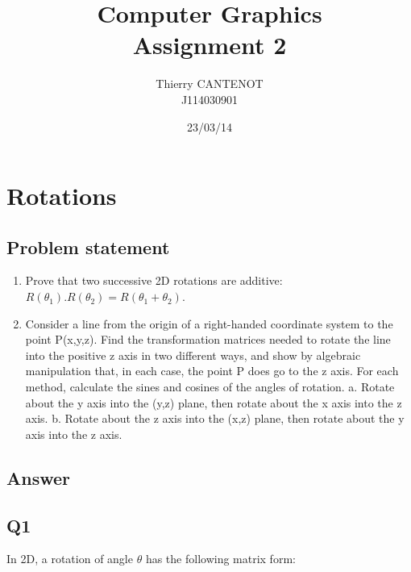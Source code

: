 \documentclass[a4paper,10pt]{article}
\title{\textbf{Computer Graphics} \\ Assignment 2}
\author{Thierry CANTENOT \\ J114030901}
\date{23/03/14}
\begin{document}
\maketitle

\section{Rotations}
\bigskip

\subsection{Problem statement}
\bigskip

\begin{enumerate}
\item Prove that two successive 2D rotations are additive:\\ $R(\theta_1) . R(\theta_2) = R(\theta_1+\theta_2)$.

\bigskip
\item Consider a line from the origin of a right-handed coordinate system to the point P(x,y,z). Find the transformation matrices needed to rotate the line into the positive z axis in two different ways, and show by algebraic manipulation that, in each case, the point P does go to the z axis. For each method, calculate the sines and cosines of the angles of rotation.
a. Rotate about the y axis into the (y,z) plane, then rotate about the x axis into the z axis.
b. Rotate about the z axis into the (x,z) plane, then rotate about the y axis into the z axis.

\end{enumerate}

\pagebreak
\subsection{Answer}
\bigskip

\subsection{Q1}
\bigskip
In 2D, a rotation of angle $\theta$ has the following matrix form:
\end{document}
